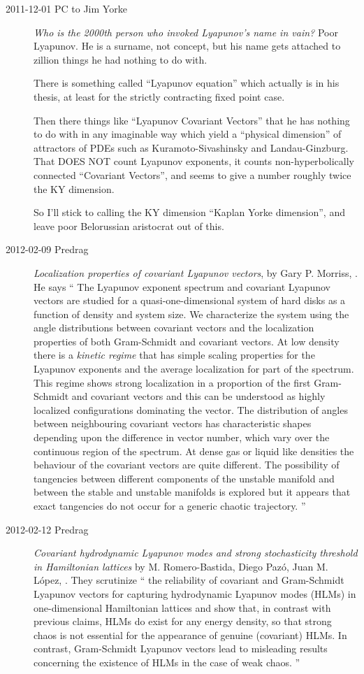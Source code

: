 \begin{description}
\item[2011-12-01 PC to Jim Yorke] \emph{Who is the 2000th person who
invoked Lyapunov's name in vain?} Poor Lyapunov. He is a surname, not
concept, but his name gets attached to zillion things he had nothing to
do with.

There is something called ``Lyapunov equation'' which actually is in his
thesis, at least for the strictly contracting fixed point case.

Then there things like ``Lyapunov Covariant Vectors'' that he has nothing
to do with in any imaginable way which yield a ``physical dimension'' of
attractors of PDEs such as Kuramoto-Sivashinsky and Landau-Ginzburg. That
DOES NOT count Lyapunov exponents, it counts non-hyperbolically connected
``Covariant Vectors'', and seems to give a number roughly twice the KY
dimension.

So I'll stick to calling the KY dimension  ``Kaplan Yorke dimension'', and
leave poor Belorussian aristocrat out of this.


\item[2012-02-09 Predrag]
{\em Localization properties of covariant {Lyapunov} vectors},
by Gary P. Morriss,
. He says
``
    The Lyapunov exponent spectrum and covariant Lyapunov vectors are studied for
a quasi-one-dimensional system of hard disks as a function of density and
system size. We characterize the system using the angle distributions between
covariant vectors and the localization properties of both Gram-Schmidt and
covariant vectors. At low density there is a {\it kinetic regime} that has
simple scaling properties for the Lyapunov exponents and the average
localization for part of the spectrum. This regime shows strong localization in
a proportion of the first Gram-Schmidt and covariant vectors and this can be
understood as highly localized configurations dominating the vector. The
distribution of angles between neighbouring covariant vectors has
characteristic shapes depending upon the difference in vector number, which
vary over the continuous region of the spectrum. At dense gas or liquid like
densities the behaviour of the covariant vectors are quite different. The
possibility of tangencies between different components of the unstable manifold
and between the stable and unstable manifolds is explored but it appears that
exact tangencies do not occur for a generic chaotic trajectory.
''

\item[2012-02-12 Predrag]
{\em Covariant hydrodynamic Lyapunov modes and strong stochasticity threshold
 in Hamiltonian lattices}
by M. Romero-Bastida, Diego Paz\'o, Juan M. L\'opez, . They scrutinize
``
the reliability of covariant and Gram-Schmidt Lyapunov vectors
for capturing hydrodynamic Lyapunov modes (HLMs) in one-dimensional Hamiltonian
lattices and show that, in contrast with previous claims, HLMs do exist for any
energy density, so that strong chaos is not essential for the appearance of
genuine (covariant) HLMs. In contrast, Gram-Schmidt Lyapunov vectors lead to
misleading results concerning the existence of HLMs in the case of weak chaos.
''


\end{description}
